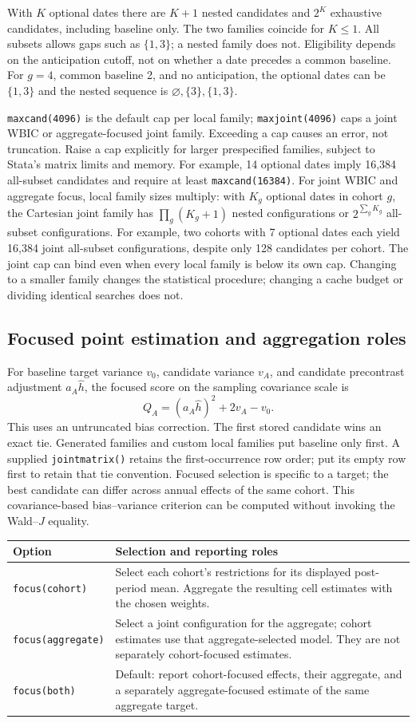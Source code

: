 \documentclass[11pt]{article}
\newcommand{\cmd}[1]{\texttt{#1}}
\begin{document}
With $K$ optional dates there are $K+1$ nested candidates and $2^K$ exhaustive
candidates, including baseline only. The two families coincide for $K\leq1$.
All subsets allows gaps such as $\{1,3\}$; a nested family does not.
Eligibility depends on the anticipation cutoff, not on whether a date precedes
a common baseline. For $g=4$, common baseline 2, and no anticipation, the
optional dates can be $\{1,3\}$ and the nested sequence is
$\varnothing,\{3\},\{1,3\}$.

\cmd{maxcand(4096)} is the default cap per local family;
\cmd{maxjoint(4096)} caps a joint WBIC or aggregate-focused joint family. Exceeding a cap
causes an error, not truncation. Raise a cap explicitly for larger prespecified
families, subject to Stata's matrix limits and memory. For example, 14 optional dates imply 16,384 all-subset candidates and
require at least \cmd{maxcand(16384)}. For joint WBIC and aggregate focus, local family sizes
multiply: with $K_g$ optional dates in cohort $g$, the Cartesian joint family
has $\prod_g(K_g+1)$ nested configurations or $2^{\sum_g K_g}$ all-subset
configurations. For example, two cohorts with 7 optional dates each yield
16,384 joint all-subset configurations, despite only 128 candidates per cohort.
The joint cap can bind even when every local family is below its own cap.
Changing to a smaller family changes the statistical procedure; changing a
cache budget or dividing identical searches does not.

\subsection{Focused point estimation and aggregation roles}
For baseline target variance $v_0$, candidate variance $v_A$, and candidate
precontrast adjustment $a_A\widehat h$, the focused score on the sampling
covariance scale is
\[
 Q_A=(a_A\widehat h)^2+2v_A-v_0.
\]
This uses an untruncated bias correction. The first stored candidate wins an exact tie. Generated families and
custom local families put baseline only first. A supplied \cmd{jointmatrix()}
retains the first-occurrence row order; put its empty row first to retain
that tie convention.
Focused selection is specific to a target; the best candidate can differ
across annual effects of the same cohort. This covariance-based bias--variance
criterion can be computed without invoking the Wald--$J$ equality.


\begin{tabularx}{\linewidth}{@{}lX@{}}
\toprule
Option & Selection and reporting roles \\
\midrule
\cmd{focus(cohort)} & Select each cohort's restrictions for its displayed post-period mean. Aggregate the resulting cell estimates with the chosen weights. \\
\cmd{focus(aggregate)} & Select a joint configuration for the aggregate; cohort estimates use that aggregate-selected model. They are not separately cohort-focused estimates. \\
\cmd{focus(both)} & Default: report cohort-focused effects, their aggregate, and a separately aggregate-focused estimate of the same aggregate target. \\
\bottomrule
\end{tabularx}
\end{document}
